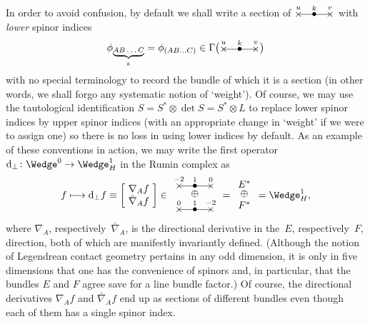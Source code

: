 \documentclass[10pt,a4paper]{amsart}
\numberwithin{equation}{section}
\newcommand{\xox}[3]{\begin{picture}(40,11)
\put(4,1.5){\makebox(0,0){$\times$}}
\put(20,1.5){\makebox(0,0){$\bullet$}}
\put(36,1.5){\makebox(0,0){$\times$}}
\put(4,1.5){\line(1,0){32}}
\put(4,8){\makebox(0,0){$\scriptstyle #1$}}
\put(20,8){\makebox(0,0){$\scriptstyle #2$}}
\put(36,8){\makebox(0,0){$\scriptstyle #3$}}
\end{picture}}
\begin{document}
In order to avoid confusion, by default we shall write a section of
$\xox{u}{k}{v}$ with {\em lower} spinor indices
\[\phi_{\mbox{\scriptsize$\underbrace{AB\dots C}_k$}}=\phi_{(AB\dots C)}
\in\Gamma\big(\xox{u}{k}{v}\big)\]
with no special terminology to record the bundle of which it is a section (in
other words, we shall forgo any systematic notion of `weight'). Of course, we
may use the tautological identification $S=S^*\otimes\det S=S^*\otimes L$ to
replace lower spinor indices by upper spinor indices (with an appropriate
change in `weight' if we were to assign one) so there is no loss in using lower
indices by default. As an example of these conventions in action, we may write
the first operator ${\rm d}_\perp\colon \Wedge^0\to\Wedge_H^1$ in the Rumin complex as
\begin{equation}\label{first_rumin}
f\longmapsto {\rm d}_\perp f\equiv\left[\!\begin{array}{c}\nabla_Af\\
\bar\nabla_Af\end{array}\!\right]
\in\begin{array}{c}\xox{-2}{1}{0}\\[-3pt] \oplus\\ \xox{0}{1}{-2}\end{array}
=\begin{array}{c}E^*\\[-3pt] \oplus\\ F^*\end{array}=\Wedge^1_H,
\end{equation}
where $\nabla_A$, respectively~$\bar\nabla_A$, is the directional derivative in
the~$E$, respectively~$F$, direction, both of which are manifestly invariantly
defined. (Although the notion of Legendrean contact geometry pertains in any
odd dimension, it is only in five dimensions that one has the convenience of
spinors and, in particular, that the bundles $E$ and $F$ agree save for a line
bundle factor.) Of course, the directional derivatives $\nabla_Af$ and
$\bar\nabla_Af$ end up as sections of different bundles even though each of
them has a single spinor index.
\end{document}
